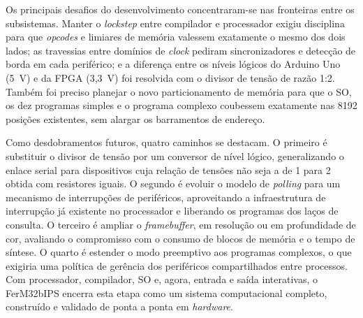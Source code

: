 \documentclass[
	12pt,
	oneside,
	a4paper,
	english,
	french,
	spanish,
	brazil,
	]{abntex2}
\begin{document}
Os principais desafios do desenvolvimento concentraram-se nas fronteiras entre os subsistemas. Manter o \emph{lockstep} entre compilador e processador exigiu disciplina para que \emph{opcodes} e limiares de memória valessem exatamente o mesmo dos dois lados; as travessias entre domínios de \emph{clock} pediram sincronizadores e detecção de borda em cada periférico; e a diferença entre os níveis lógicos do Arduino Uno (5~V) e da FPGA (3,3~V) foi resolvida com o divisor de tensão de razão 1:2. Também foi preciso planejar o novo particionamento de memória para que o SO, os dez programas simples e o programa complexo coubessem exatamente nas 8192 posições existentes, sem alargar os barramentos de endereço.

Como desdobramentos futuros, quatro caminhos se destacam. O primeiro é substituir o divisor de tensão por um conversor de nível lógico, generalizando o enlace serial para dispositivos cuja relação de tensões não seja a de 1 para 2 obtida com resistores iguais. O segundo é evoluir o modelo de \emph{polling} para um mecanismo de interrupções de periféricos, aproveitando a infraestrutura de interrupção já existente no processador e liberando os programas dos laços de consulta. O terceiro é ampliar o \emph{framebuffer}, em resolução ou em profundidade de cor, avaliando o compromisso com o consumo de blocos de memória e o tempo de síntese. O quarto é estender o modo preemptivo aos programas complexos, o que exigiria uma política de gerência dos periféricos compartilhados entre processos. Com processador, compilador, SO e, agora, entrada e saída interativas, o FerM32bIPS encerra esta etapa como um sistema computacional completo, construído e validado de ponta a ponta em \emph{hardware}.


\end{document}
